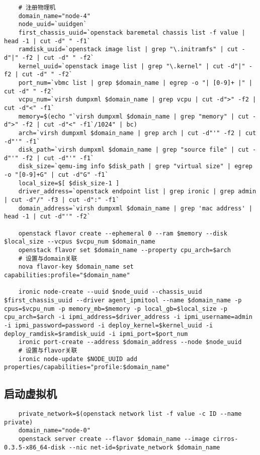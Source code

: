 \documentclass[a4paper,left=2.5cm,right=2.5cm,11pt]{article}
\begin{document}
	\begin{lstlisting}
	# 注册物理机
	domain_name="node-4"
	node_uuid=`uuidgen`
	first_chassis_uuid=`openstack baremetal chassis list -f value | head -1 | cut -d" " -f1`
	ramdisk_uuid=`openstack image list | grep "\.initramfs" | cut -d"|" -f2 | cut -d" " -f2`
	kernel_uuid=`openstack image list | grep "\.kernel" | cut -d"|" -f2 | cut -d" " -f2`
	port_num=`vbmc list | grep $domain_name | egrep -o "| [0-9]+ |" | cut -d" " -f2`
	vcpu_num=`virsh dumpxml $domain_name | grep vcpu | cut -d">" -f2 | cut -d"<" -f1`
	memory=$(echo "`virsh dumpxml $domain_name | grep "memory" | cut -d">" -f2 | cut -d"<" -f1`/1024" | bc)
	arch=`virsh dumpxml $domain_name | grep arch | cut -d"'" -f2 | cut -d"'" -f1`
	disk_path=`virsh dumpxml $domain_name | grep "source file" | cut -d"'" -f2 | cut -d"'" -f1`
	disk_size=`qemu-img info $disk_path | grep "virtual size" | egrep -o "[0-9]+G" | cut -d"G" -f1`
	local_size=$[ $disk_size-1 ]
	driver_address=`openstack endpoint list | grep ironic | grep admin | cut -d"/" -f3 | cut -d":" -f1`
	domain_address=`virsh dumpxml $domain_name | grep 'mac address' | head -1 | cut -d"'" -f2`

	openstack flavor create --ephemeral 0 --ram $memory --disk $local_size --vcpus $vcpu_num $domain_name
	openstack flavor set $domain_name --property cpu_arch=$arch
	# 设置与domain关联
	nova flavor-key $domain_name set capabilities:profile="$domain_name"

	ironic node-create --uuid $node_uuid --chassis_uuid $first_chassis_uuid --driver agent_ipmitool --name $domain_name -p cpus=$vcpu_num -p memory_mb=$memory -p local_gb=$local_size -p cpu_arch=$arch -i ipmi_address=$driver_address -i ipmi_username=admin -i ipmi_password=password -i deploy_kernel=$kernel_uuid -i deploy_ramdisk=$ramdisk_uuid -i ipmi_port=$port_num
	ironic port-create --address $domain_address --node $node_uuid
	# 设置与flavor关联
	ironic node-update $NODE_UUID add properties/capabilities="profile:$domain_name"
	\end{lstlisting}

\subsection{启动虚拟机}
	\begin{lstlisting}
	private_network=$(openstack network list -f value -c ID --name private)
	domain_name="node-0"
	openstack server create --flavor $domain_name --image cirros-0.3.5-x86_64-disk --nic net-id=$private_network $domain_name
	\end{lstlisting}
\end{document}
